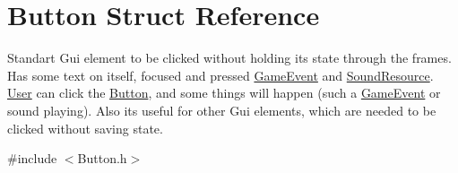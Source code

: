\hypertarget{struct_button}{}\section{Button Struct Reference}
\label{struct_button}


Standart Gui element to be clicked without holding it\textquotesingle{}s state through the frames. Has some text on itself, focused and pressed \hyperlink{struct_game_event}{Game\+Event} and \hyperlink{struct_sound_resource}{Sound\+Resource}. \hyperlink{struct_user}{User} can click the \hyperlink{struct_button}{Button}, and some things will happen (such a \hyperlink{struct_game_event}{Game\+Event} or sound playing). Also it\textquotesingle{}s useful for other Gui elements, which are needed to be clicked without saving state.  




{\ttfamily \#include $<$Button.\+h$>$}

